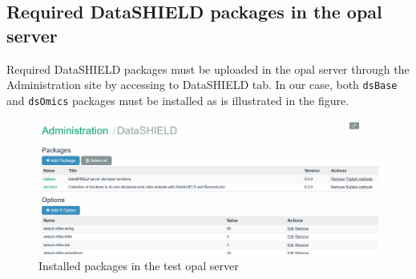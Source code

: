 \documentclass[]{article}
\newenvironment{Shaded}{\begin{snugshade}}{\end{snugshade}}
\newcommand{\DecValTok}[1]{\textcolor[rgb]{0.00,0.00,0.81}{#1}}
\newcommand{\ErrorTok}[1]{\textcolor[rgb]{0.64,0.00,0.00}{\textbf{#1}}}
\newcommand{\KeywordTok}[1]{\textcolor[rgb]{0.13,0.29,0.53}{\textbf{#1}}}
\newcommand{\NormalTok}[1]{#1}
\newcommand{\OperatorTok}[1]{\textcolor[rgb]{0.81,0.36,0.00}{\textbf{#1}}}
\newcommand{\StringTok}[1]{\textcolor[rgb]{0.31,0.60,0.02}{#1}}
\begin{document}
\begin{Shaded}
\end{Shaded}

\hypertarget{required-datashield-packages-in-the-opal-server}{%
\subsection{Required DataSHIELD packages in the opal
server}\label{required-datashield-packages-in-the-opal-server}}

Required DataSHIELD packages must be uploaded in the opal server through
the Administration site by accessing to DataSHIELD tab. In our case,
both \texttt{dsBase} and \texttt{dsOmics} packages must be installed as
is illustrated in the figure.

\begin{figure}

{\centering \includegraphics[width=25.58in]{fig/add_packages_opal} 

}

\caption{Installed packages in the test opal server}\label{fig:installPackagesOpal}
\end{figure}
\end{document}
